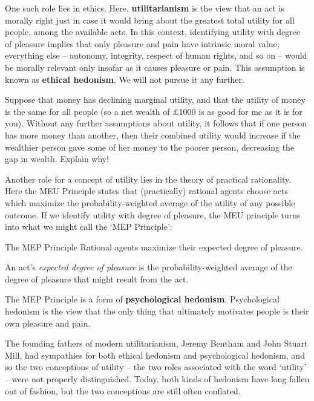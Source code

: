 One such role lies in ethics. Here, \textbf{utilitarianism} is the view that an
act is morally right just in case it would bring about the greatest total
utility for all people, among the available acts. In this context, identifying
utility with degree of pleasure implies that only pleasure and pain have
intrinsic moral value; everything else -- autonomy, integrity, respect of human
rights, and so on -- would be morally relevant only insofar as it causes
pleasure or pain. This assumption is known as \textbf{ethical hedonism}. We will
not pursue it any further.

\begin{exercise1}
  Suppose that money has declining marginal utility, and that the
  utility of money is the same for all people (so a net wealth of
  £1000 is as good for me as it is for you). Without any further
  assumptions about utility, it follows that if one person has more
  money than another, then their combined utility would increase if
  the wealthier person gave some of her money to the poorer person,
  decreasing the gap in wealth. Explain why!
\end{exercise1}

Another role for a concept of utility lies in the theory of practical
rationality. Here the MEU Principle states that (practically) rational agents
choose acts which maximize the probability-weighted average of the utility of
any possible outcome. If we identify utility with degree of pleasure, the MEU
principle turns into what we might call the `MEP Principle':
%
\begin{genericthm}{The MEP Principle}
  Rational agents maximize their expected degree of pleasure. 
\end{genericthm}
%
An act's \emph{expected degree of pleasure} is the
probability-weighted average of the degree of pleasure that might
result from the act. 

The MEP Principle is a form of \textbf{psychological
  hedonism}. Psychological hedonism is the view that the only thing
that ultimately motivates people is their own pleasure and pain.

The founding fathers of modern utilitarianism, Jeremy Bentham and John
Stuart Mill, had sympathies for both ethical hedonism and
psychological hedonism, and so the two conceptions of utility -- the
two roles associated with the word `utility' -- were not properly
distinguished. Today, both kinds of hedonism have long fallen out of
fashion, but the two conceptions are still often conflated.

